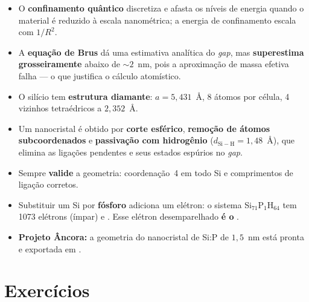 \begin{itemize}[leftmargin=*]
  \item O \textbf{confinamento quântico} discretiza e afasta os níveis de energia
        quando o material é reduzido à escala nanométrica; a energia de
        confinamento escala com $1/R^2$.
  \item A \textbf{equação de Brus} dá uma estimativa analítica do \emph{gap}, mas
        \textbf{superestima grosseiramente} abaixo de $\sim 2$~nm, pois a
        aproximação de massa efetiva falha --- o que justifica o cálculo
        atomístico.
  \item O silício tem \textbf{estrutura diamante}: $a = 5{,}431$~Å, 8 átomos por
        célula, 4 vizinhos tetraédricos a $2{,}352$~Å.
  \item Um nanocristal é obtido por \textbf{corte esférico}, \textbf{remoção de
        átomos subcoordenados} e \textbf{passivação com hidrogênio}
        ($d_{\mathrm{Si-H}} = 1{,}48$~Å), que elimina as ligações pendentes e seus
        estados espúrios no \emph{gap}.
  \item Sempre \textbf{valide} a geometria: coordenação~4 em todo Si e
        comprimentos de ligação corretos.
  \item Substituir um Si por \textbf{fósforo} adiciona um elétron: o sistema
        Si$_{71}$P$_1$H$_{64}$ tem 1073 elétrons (ímpar) e . Esse
        elétron desemparelhado \textbf{é o \qubit{}}.
  \item \textbf{Projeto Âncora:} a geometria do nanocristal de Si:P de $1{,}5$~nm
        está pronta e exportada em .
\end{itemize}

\section*{Exercícios}

